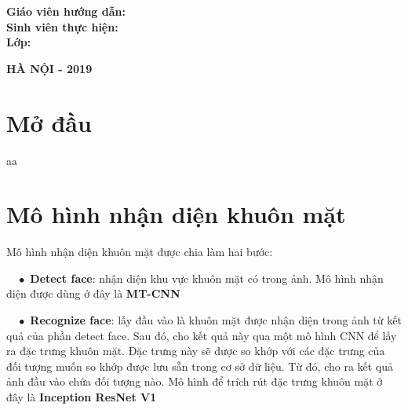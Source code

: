 \documentclass[12pt]{extreport}
\begin{document}
\begin{flushleft}
\hspace{1.5 cm} \textbf{ Giáo viên hướng dẫn:\hspace{0.2cm}{ Ts. TRẦN NGỌC THĂNG }}\\[0.2cm]
\hspace{1.5 cm} \textbf{ Sinh viên thực hiện\hspace{0.3cm}:}\\[0.2cm]
\hspace{1.5 cm} \textbf{ Lớp\hspace{3.8cm}:\hspace{0.2cm}{ KSTN TOÁN TIN - K60}}\\
\end{flushleft}

\vspace{1.0cm}
\begin{center}
\textbf{{\large HÀ NỘI - 2019}}\\
\end{center}

\tableofcontents

\newpage
\chapter*{Mở đầu}
aa

\newpage
\chapter{Mô hình nhận diện khuôn mặt }
Mô hình nhận diện khuôn mặt được chia làm hai bước:

$\quad \bullet$ \textbf{Detect face}: nhận diện khu vực khuôn mặt có trong ảnh. Mô hình nhận diện được dùng ở đây là \textbf{MT-CNN}

$\quad \bullet$ \textbf{Recognize face}: lấy đầu vào là khuôn mặt được nhận diện trong ảnh từ kết quả của phần detect face. Sau đó, cho kết quả này qua một mô hình CNN để lấy ra đặc trưng khuôn mặt. Đặc trưng này sẽ được so khớp với các đặc trưng của đối tượng muốn so khớp được lưu sẵn trong cơ sở dữ liệu. Từ đó, cho ra kết quả ảnh đầu vào chứa đối tượng nào. Mô hình để trích rút đặc trưng khuôn mặt ở đây là \textbf{Inception ResNet V1}
\end{document}

